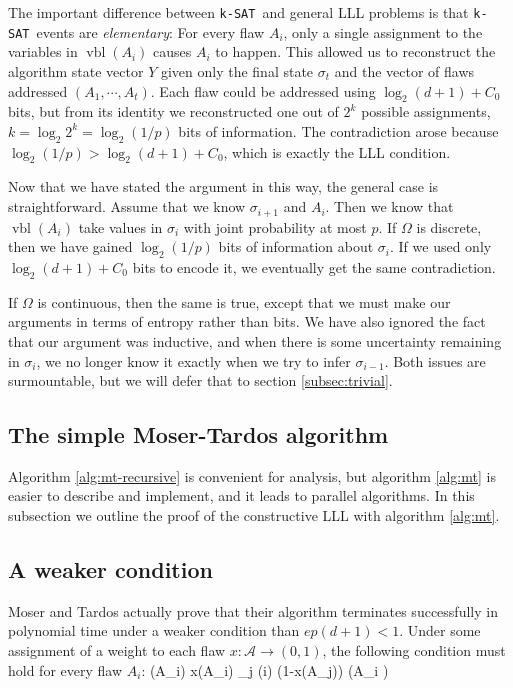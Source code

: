 \documentclass[twocolumn]{article}
\newcommand{\ksat}{\texttt{k-SAT}~}
\def\seqn#1\eeqn{\begin{align}#1\end{align}}
\begin{document}
The important difference between \ksat and general LLL problems is that \ksat events are \emph{elementary}: For every flaw $A_i$, only a single assignment to the variables in $\operatorname{vbl}(A_i)$ causes $A_i$ to happen.  This allowed us to reconstruct the algorithm state vector $Y$ given only the final state $\sigma_{t}$ and the vector of flaws addressed $(A_1, \cdots, A_t)$.  Each flaw could be addressed using $\log_2 (d+1) + C_0$ bits, but from its identity we reconstructed one out of $2^k$ possible assignments, $k = \log_2 2^k = \log_2 (1/p)$ bits of information.  The contradiction arose because $\log_2 (1/p) > \log_2 (d+1) + C_0$, which is exactly the LLL condition.

Now that we have stated the argument in this way, the general case is straightforward.  Assume that we know $\sigma_{i+1}$ and $A_i$.  Then we know that $\operatorname{vbl}(A_i)$ take values in $\sigma_i$ with joint probability at most $p$.  If $\Omega$ is discrete, then we have gained $\log_2 (1/p)$ bits of information about $\sigma_i$.  If we used only $\log_2 (d+1) + C_0$ bits to encode it, we eventually get the same contradiction.

If $\Omega$ is continuous, then the same is true, except that we must make our arguments in terms of entropy rather than bits.  We have also ignored the fact that our argument was inductive, and when there is some uncertainty remaining in $\sigma_{i}$, we no longer know it exactly when we try to infer $\sigma_{i-1}$.  Both issues are surmountable, but we will defer that to section \ref{subsec:trivial}.

\subsection{The simple Moser-Tardos algorithm}
Algorithm \ref{alg:mt-recursive} is convenient for analysis, but algorithm \ref{alg:mt} is easier to describe and implement, and it leads to parallel algorithms.  In this subsection we outline the proof of the constructive LLL with algorithm \ref{alg:mt}.

\subsection{A weaker condition}
Moser and Tardos actually prove that their algorithm terminates successfully in polynomial time under a weaker condition than $e p (d+1) < 1$.  Under some assignment of a weight to each flaw $x: \mathcal{A} \to (0,1)$, the following condition must hold for every flaw $A_i$:
\seqn
  P(A_i) \leq x(A_i) \prod_{j \in \Gamma(i)} (1-x(A_j)) (\forall A_i \in {}) \label{eqn:general-lll-req}
\eeqn
\end{document}
